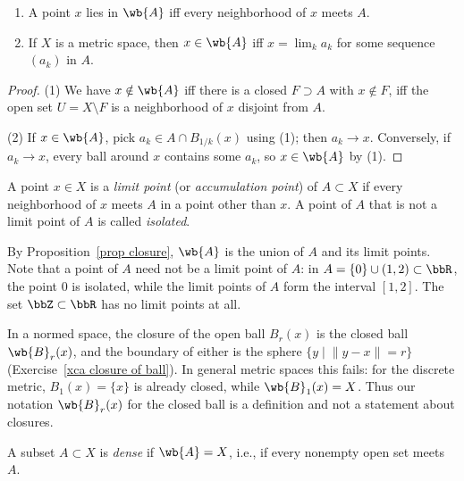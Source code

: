 \begin{prop}\label{prop closure}
    \begin{enumerate}
        \item A point $x$ lies in $\wb{A}$ iff every neighborhood of $x$ meets $A$.
        \item If $X$ is a metric space, then $x\in\wb{A}$ iff $x=\lim_k a_k$ for some sequence $(a_k)$ in $A$.
    \end{enumerate}
\end{prop}
\begin{proof}
    (1) We have $x\notin\wb{A}$ iff there is a closed $F\supset A$ with $x\notin F$, iff the open set $U=X\setminus F$ is a neighborhood of $x$ disjoint from $A$.

    (2) If $x\in\wb{A}$, pick $a_k\in A\cap B_{1/k}(x)$ using (1); then $a_k\to x$. Conversely, if $a_k\to x$, every ball around $x$ contains some $a_k$, so $x\in\wb{A}$ by (1).
\end{proof}

\begin{defn}
    A point $x\in X$ is a \emph{limit point} (or \emph{accumulation point}) of $A\subset X$ if every neighborhood of $x$ meets $A$ in a point other than $x$. A point of $A$ that is not a limit point of $A$ is called \emph{isolated}.
\end{defn}

By Proposition~\ref{prop closure}, $\wb{A}$ is the union of $A$ and its limit points. Note that a point of $A$ need not be a limit point of $A$: in $A=\{0\}\cup(1,2)\subset\bbR$, the point $0$ is isolated, while the limit points of $A$ form the interval $[1,2]$. The set $\bbZ\subset\bbR$ has no limit points at all.

\begin{example}\label{example closure of ball}
    In a normed space, the closure of the open ball $B_r(x)$ is the closed ball $\wb{B}_r(x)$, and the boundary of either is the sphere $\{y\mid\lVert y-x\rVert=r\}$ (Exercise~\ref{xca closure of ball}). In general metric spaces this fails: for the discrete metric, $B_1(x)=\{x\}$ is already closed, while $\wb{B}_1(x)=X$. Thus our notation $\wb{B}_r(x)$ for the closed ball is a definition and not a statement about closures.
\end{example}

\begin{defn}
    A subset $A\subset X$ is \emph{dense} if $\wb{A}=X$, i.e., if every nonempty open set meets $A$.
\end{defn}

